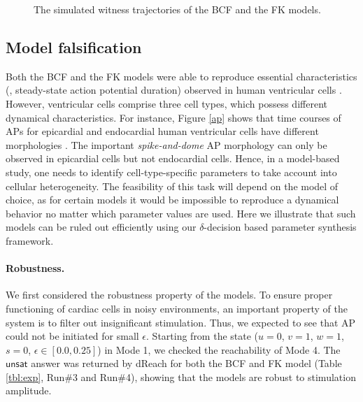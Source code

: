 \begin{figure}[thb]
\centering
{}
\caption{The simulated witness trajectories of the BCF and the FK models.}
\label{trace}
\end{figure}


\subsection{Model falsification}
Both the BCF and the FK models were able to reproduce essential characteristics (\eg, steady-state action potential duration) observed in human ventricular cells \cite{fenton98,orovio08}. However, ventricular cells comprise three cell types, which possess different dynamical characteristics. For instance, Figure \ref{ap} shows that time courses of APs for epicardial and endocardial human ventricular cells have different morphologies \cite{nabauer96}. The important \textit{spike-and-dome} AP morphology can only be observed in epicardial cells but not endocardial cells. Hence, in a model-based study, one needs to identify cell-type-specific parameters to take account into cellular heterogeneity. The feasibility of this task will depend on the model of choice, as for certain models it would be impossible to reproduce a dynamical behavior no matter which parameter values are used. Here we illustrate that such models can be ruled out efficiently using our $\delta$-decision based parameter synthesis framework.

\paragraph{Robustness.}
We first considered the robustness property of the models. To ensure proper functioning of cardiac cells in noisy environments, an important property of the system is to filter out insignificant stimulation. Thus, we expected to see that AP could not be initiated for small $\epsilon$. Starting from the state ($u = 0$, $v = 1$, $w = 1$, $s = 0$, $\epsilon \in [0.0,0.25]$) in Mode 1, we checked the reachability of Mode 4. The $\mathsf{unsat}$ answer was returned by dReach for both the BCF and FK
model (Table \ref{tbl:exp}, Run\#3 and Run\#4), showing that the models are robust to stimulation amplitude.


